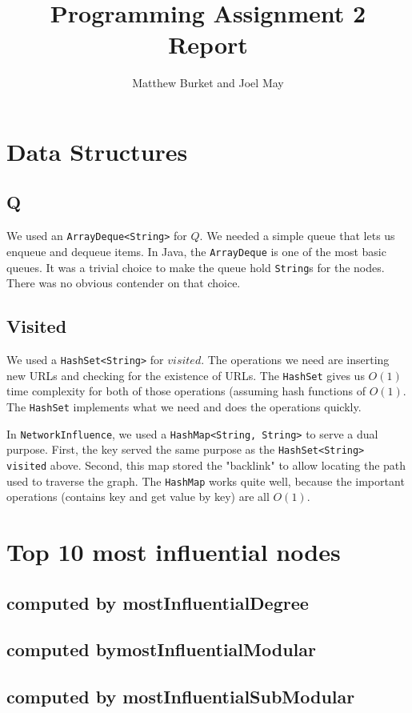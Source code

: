 \documentclass[10pt,letterpaper]{article}
\author{Matthew Burket and Joel May}
\title{Programming Assignment 2 Report}
\begin{document}
\maketitle

\section{Data Structures}
\subsection{Q}
We used an \texttt{ArrayDeque<String>} for $Q$. We needed a simple queue that lets us enqueue and dequeue items. In Java, the \texttt{ArrayDeque} is one of the most basic queues. It was a trivial choice to make the queue hold \texttt{String}s for the nodes. There was no obvious contender on that choice.
\subsection{Visited}
We used a \texttt{HashSet<String>} for $visited$. The operations we need are inserting new URLs and checking for the existence of URLs. The \texttt{HashSet} gives us $O(1)$ time complexity for both of those operations (assuming hash functions of $O(1)$. The \texttt{HashSet} implements what we need and does the operations quickly.

In \texttt{NetworkInfluence}, we used a \texttt{HashMap<String, String>} to serve a dual purpose. First, the key served the same purpose as the \texttt{HashSet<String> visited} above. Second, this map stored the "backlink" to allow locating the path used to traverse the graph. The \texttt{HashMap} works quite well, because the important operations (contains key and get value by key) are all $O(1)$.
\section{Top 10 most influential nodes}
\subsection{computed by mostInfluentialDegree}
\subsection{computed bymostInfluentialModular}
\subsection{computed by mostInfluentialSubModular}
\end{document}
